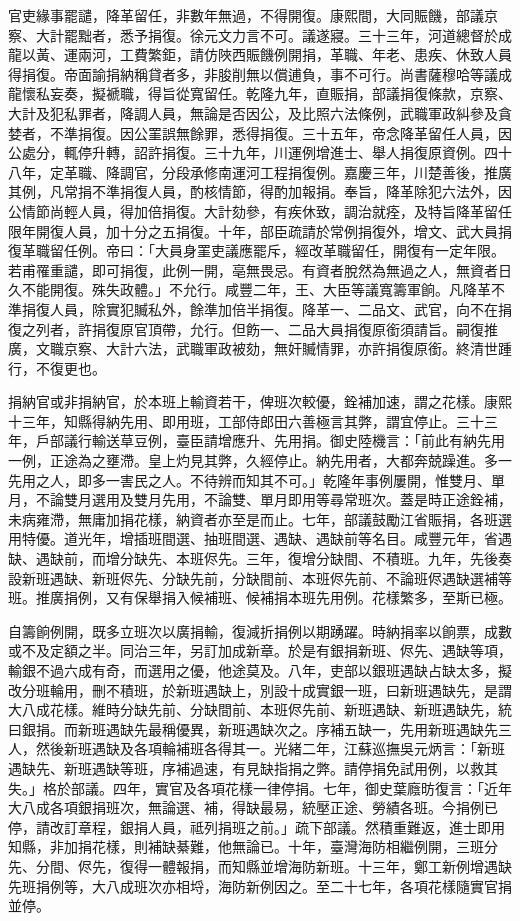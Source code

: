 \begin{pinyinscope}
官吏緣事罷譴，降革留任，非數年無過，不得開復。康熙間，大同賑饑，部議京察、大計罷黜者，悉予捐復。徐元文力言不可。議遂寢。三十三年，河道總督於成龍以黃、運兩河，工費繁鉅，請仿陜西賑饑例開捐，革職、年老、患疾、休致人員得捐復。帝面諭捐納稱貸者多，非朘削無以償逋負，事不可行。尚書薩穆哈等議成龍懷私妄奏，擬褫職，得旨從寬留任。乾隆九年，直賑捐，部議捐復條款，京察、大計及犯私罪者，降調人員，無論是否因公，及比照六法條例，武職軍政糾參及貪婪者，不準捐復。因公罣誤無餘罪，悉得捐復。三十五年，帝念降革留任人員，因公處分，輒停升轉，詔許捐復。三十九年，川運例增進士、舉人捐復原資例。四十八年，定革職、降調官，分段承修南運河工程捐復例。嘉慶三年，川楚善後，推廣其例，凡常捐不準捐復人員，酌核情節，得酌加報捐。奉旨，降革除犯六法外，因公情節尚輕人員，得加倍捐復。大計劾參，有疾休致，調治就痊，及特旨降革留任限年開復人員，加十分之五捐復。十年，部臣疏請於常例捐復外，增文、武大員捐復革職留任例。帝曰：「大員身罣吏議應罷斥，經改革職留任，開復有一定年限。若甫罹重譴，即可捐復，此例一開，亳無畏忌。有資者脫然為無過之人，無資者日久不能開復。殊失政體。」不允行。咸豐二年，王、大臣等議寬籌軍餉。凡降革不準捐復人員，除實犯贓私外，餘準加倍半捐復。降革一、二品文、武官，向不在捐復之列者，許捐復原官頂帶，允行。但飭一、二品大員捐復原銜須請旨。嗣復推廣，文職京察、大計六法，武職軍政被劾，無奸贓情罪，亦許捐復原銜。終清世踵行，不復更也。

捐納官或非捐納官，於本班上輸資若干，俾班次較優，銓補加速，謂之花樣。康熙十三年，知縣得納先用、即用班，工部侍郎田六善極言其弊，謂宜停止。三十三年，戶部議行輸送草豆例，臺臣請增應升、先用捐。御史陸機言：「前此有納先用一例，正途為之壅滯。皇上灼見其弊，久經停止。納先用者，大都奔兢躁進。多一先用之人，即多一害民之人。不待辨而知其不可。」乾隆年事例屢開，惟雙月、單月，不論雙月選用及雙月先用，不論雙、單月即用等尋常班次。蓋是時正途銓補，未病雍滯，無庸加捐花樣，納資者亦至是而止。七年，部議鼓勵江省賑捐，各班選用特優。道光年，增插班間選、抽班間選、遇缺、遇缺前等名目。咸豐元年，省遇缺、遇缺前，而增分缺先、本班侭先。三年，復增分缺間、不積班。九年，先後奏設新班遇缺、新班侭先、分缺先前，分缺間前、本班侭先前、不論班侭遇缺選補等班。推廣捐例，又有保舉捐入候補班、候補捐本班先用例。花樣繁多，至斯已極。

自籌餉例開，既多立班次以廣捐輸，復減折捐例以期踴躍。時納捐率以餉票，成數或不及定額之半。同治三年，另訂加成新章。於是有銀捐新班、侭先、遇缺等項，輸銀不過六成有奇，而選用之優，他途莫及。八年，吏部以銀班遇缺占缺太多，擬改分班輪用，刪不積班，於新班遇缺上，別設十成實銀一班，曰新班遇缺先，是謂大八成花樣。維時分缺先前、分缺間前、本班侭先前、新班遇缺、新班遇缺先，統曰銀捐。而新班遇缺先最稱優異，新班遇缺次之。序補五缺一，先用新班遇缺先三人，然後新班遇缺及各項輪補班各得其一。光緒二年，江蘇巡撫吳元炳言：「新班遇缺先、新班遇缺等班，序補過速，有見缺指捐之弊。請停捐免試用例，以救其失。」格於部議。四年，實官及各項花樣一律停捐。七年，御史葉廕昉復言：「近年大八成各項銀捐班次，無論選、補，得缺最易，統壓正途、勞績各班。今捐例已停，請改訂章程，銀捐人員，祗列捐班之前。」疏下部議。然積重難返，進士即用知縣，非加捐花樣，則補缺綦難，他無論已。十年，臺灣海防相繼例開，三班分先、分間、侭先，復得一體報捐，而知縣並增海防新班。十三年，鄭工新例增遇缺先班捐例等，大八成班次亦相埒，海防新例因之。至二十七年，各項花樣隨實官捐並停。


\end{pinyinscope}
